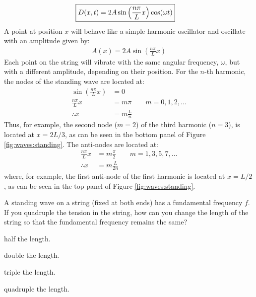 \begin{align}
\Aboxed{D(x,t)=2A\sin\left(\frac{n\pi}{L}x\right)\cos(\omega t) }
\end{align}
A point at position $x$ will behave like a simple harmonic oscillator and oscillate with an amplitude given by:
\begin{align*}
A(x) = 2A\sin\left(\frac{n\pi}{L}x\right)
\end{align*}
Each point on the string will vibrate with the same angular frequency, $\omega$, but with a different amplitude, depending on their position. For the $n$-th harmonic, the nodes of the standing wave are located at:
\begin{align*}
\sin\left(\frac{n\pi}{L}x\right) &=0\\
\frac{n\pi}{L}x &= m\pi \quad\quad m=0,1,2,\dots\\
\therefore x &= m\frac{L}{n} 
\end{align*}
Thus, for example, the second node ($m=2$) of the third harmonic ($n=3$), is located at $x=2L/3$, as can be seen in the bottom panel of Figure \ref{fig:waves:standing}. The anti-nodes are located at:
\begin{align*}
\frac{n\pi}{L}x &= m\frac{\pi}{2} \quad\quad m=1,3,5,7,\dots\\
\therefore x&=m\frac{L}{2n}
\end{align*}
where, for example, the first anti-node of the first harmonic is located at $x=L/2$, as can be seen in the top panel of Figure \ref{fig:waves:standing}.

\begin{checkpoint}\begin{MCquestion}{A standing wave on a string (fixed at both ends) has a fundamental frequency $f$. If you quadruple the tension in the string, how can you change the length of the string so that the fundamental frequency remains the same?}
\item half the length.
\item double the length. \correct
\item triple the length. 
\item quadruple the length. 
\end{MCquestion}
\end{checkpoint}

